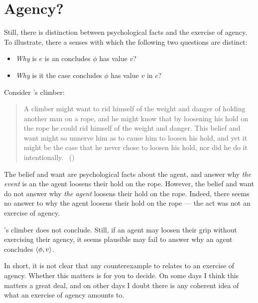 




\section{Agency?}
\label{sec:agency}

\begin{note}
  Still, there is distinction between psychological facts and the exercise of agency.
  To illustrate, there a senses with which the following two questions are distinct:

  \begin{itemize}
  \item
    \emph{Why} is \(e\) is an  \vAgent{} concludes \(\phi\) has value \(v\)?
  \item
    \emph{Why} is it the case \vAgent{} concludes \(\phi\) has value \(v\) in \(e\)?
  \end{itemize}
  Consider \citeauthor{Davidson:1973vd}'s climber:
  \begin{quote}
    A climber might want to rid himself of the weight and danger of holding another man on a rope, and he might know that by loosening his hold on the rope he could rid himself of the weight and danger.
    This belief and want might so unnerve him as to cause him to loosen his hold, and yet it might be the case that he never chose to loosen his hold, nor did he do it intentionally.%
    \mbox{ }\hfill\mbox{(\citeyear[79]{Davidson:1973vd})}
  \end{quote}
  The \agents{} belief and want are psychological facts about the agent, and answer why \emph{the event} is an  the agent loosens their hold on the rope.
  However, the \agents{} belief and want do not answer why \emph{the agent} loosens their hold on the rope.
  Indeed, there seems no answer to why the agent loosens their hold on the rope --- the act was not an exercise of agency.

  \citeauthor{Davidson:1973vd}'s climber does not conclude.
  Still, if an agent may loosen their grip without exercising their agency, it seems plausible  may fail to answer why  an agent concludes \(\langle\phi, v\rangle\).

  In short, it is not clear that any counterexample to \issueInclusion{} relates to an exercise of agency.
  Whether this matters is for you to decide.
  On some days I think this matters a great deal, and on other days I doubt there is any coherent idea of what an exercise of agency amounts to.
\end{note}


